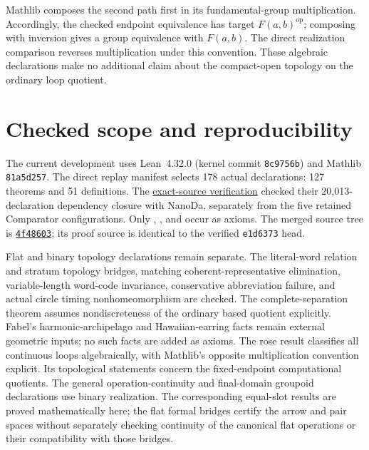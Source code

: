 \documentclass[10pt,reqno]{amsart}
\theoremstyle{definition}
\theoremstyle{plain}
\theoremstyle{remark}
\newcommand{\LeanName}[1]{\path{#1}}
\begin{document}
Mathlib composes the second path first in its fundamental-group
multiplication. Accordingly, the checked endpoint equivalence has target
$F(a,b)^{\mathrm{op}}$; composing with inversion gives a group equivalence
with $F(a,b)$. The direct realization comparison reverses multiplication
under this convention. These algebraic declarations make no additional
claim about the compact-open topology on the ordinary loop quotient.



\section{Checked scope and reproducibility}
\label{sec:formalization}
The current development uses Lean~4.32.0 (kernel commit
\texttt{8c9756b}) and Mathlib \texttt{81a5d257}. The direct replay manifest
selects 178 actual declarations: 127 theorems and 51 definitions. The
\href{https://github.com/Arthur742Ramos/TopologicalComputationalPaths/actions/runs/37742633363}{exact-source verification}
checked their 20,013-declaration dependency closure with NanoDa, separately
from the five retained Comparator configurations. Only \LeanName{propext},
\LeanName{Classical.choice}, and \LeanName{Quot.sound} occur as axioms.
The merged source tree is
\href{https://github.com/Arthur742Ramos/TopologicalComputationalPaths/tree/4f48603a9309e4273438052d387cd967ffa695ca}{\texttt{4f48603}};
its proof source is identical to the verified \texttt{e1d6373} head.

Flat and binary topology declarations remain separate. The literal-word
relation and stratum topology bridges, matching coherent-representative
elimination, variable-length word-code invariance, conservative abbreviation
failure, and actual circle timing nonhomeomorphism are checked. The
complete-separation theorem assumes nondiscreteness of the ordinary based
quotient explicitly. Fabel's harmonic-archipelago and Hawaiian-earring
facts remain external geometric inputs; no such facts are added as axioms.
The rose result classifies all continuous loops algebraically, with
Mathlib's opposite multiplication convention explicit. Its topological
statements concern the fixed-endpoint computational quotients.
The general operation-continuity and final-domain groupoid declarations
use binary realization. The corresponding equal-slot results are proved
mathematically here; the flat formal bridges certify the arrow and pair
spaces without separately checking continuity of the canonical flat
operations or their compatibility with those bridges.
\end{document}

